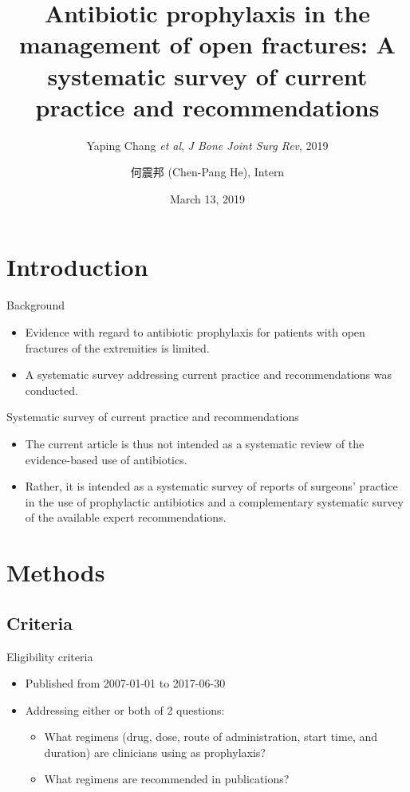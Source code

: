 \documentclass{beamer}
\title[Prophylaxis in open fracture]{
    Antibiotic prophylaxis in the management of open fractures:
    A systematic survey of current practice and recommendations
}
\subtitle{Yaping Chang \textit{et al}, \textit{J Bone Joint Surg Rev}, 2019}
\author[Chen-Pang He]{何震邦 (Chen-Pang He), Intern}
\date{March 13, 2019}
\institute[CGH]{Cathay General Hospital}
\begin{document}
\maketitle

\section{Introduction}
\begin{frame}{Background}
    \begin{itemize}
        \item Evidence with regard to antibiotic prophylaxis for patients with
              open fractures of the extremities is limited.
        \item A systematic survey addressing current practice and
              recommendations was conducted.
    \end{itemize}
\end{frame}

\begin{frame}{Systematic survey of current practice and recommendations}
    \begin{itemize}
        \item The current article is thus not intended as a systematic review
              of the evidence-based use of antibiotics.
        \item Rather, it is intended as a systematic survey of reports of
              surgeons' practice in the use of prophylactic antibiotics and a
              complementary systematic survey of the available expert
              recommendations.
    \end{itemize}
\end{frame}

\section{Methods}
\subsection{Criteria}
\begin{frame}{Eligibility criteria}
    \begin{itemize}
        \item Published from 2007-01-01 to 2017-06-30
        \item Addressing either or both of 2 questions:
            \begin{itemize}
                \item What regimens (drug, dose, route of administration, start
                      time, and duration) are clinicians using as prophylaxis?
                \item What regimens are recommended in publications?
            \end{itemize}
    \end{itemize}
\end{frame}
\end{document}
